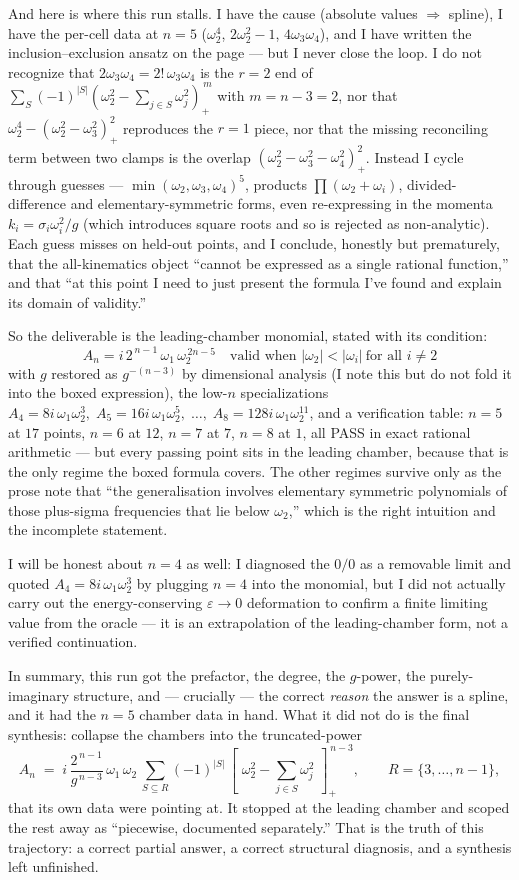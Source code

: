\documentclass{article}
\newcommand{\pp}[1]{\left[\,#1\,\right]_{+}}
\begin{document}
And here is where this run stalls. I have the cause (absolute values $\Rightarrow$
spline), I have the per-cell data at $n=5$ ($\omega_2^4$, $2\omega_2^2-1$,
$4\omega_3\omega_4$), and I have written the inclusion--exclusion ansatz on the
page --- but I never close the loop. I do not recognize that
$2\omega_3\omega_4=2!\,\omega_3\omega_4$ is the $r=2$ end of
$\sum_{S}(-1)^{|S|}(\omega_2^2-\sum_{j\in S}\omega_j^2)_+^{\,m}$ with $m=n-3=2$,
nor that $\omega_2^4-(\omega_2^2-\omega_3^2)_+^2$ reproduces the $r=1$ piece, nor
that the missing reconciling term between two clamps is the overlap
$(\omega_2^2-\omega_3^2-\omega_4^2)_+^2$. Instead I cycle through guesses ---
$\min(\omega_2,\omega_3,\omega_4)^5$, products $\prod(\omega_2+\omega_i)$,
divided-difference and elementary-symmetric forms, even re-expressing in the
momenta $k_i=\sigma_i\omega_i^2/g$ (which introduces square roots and so is
rejected as non-analytic). Each guess misses on held-out points, and I conclude,
honestly but prematurely, that the all-kinematics object ``cannot be expressed as
a single rational function,'' and that ``at this point I need to just present the
formula I've found and explain its domain of validity.''

So the deliverable is the leading-chamber monomial, stated with its condition:
\[
\boxed{\;A_n=i\,2^{\,n-1}\,\omega_1\,\omega_2^{\,2n-5}\quad
\text{valid when }|\omega_2|<|\omega_i|\ \text{for all }i\neq2\;}
\]
with $g$ restored as $g^{-(n-3)}$ by dimensional analysis (I note this but do not
fold it into the boxed expression), the low-$n$ specializations
$A_4=8i\,\omega_1\omega_2^3,\;A_5=16i\,\omega_1\omega_2^5,\;\dots,\;
A_8=128i\,\omega_1\omega_2^{11}$, and a verification table: $n=5$ at $17$ points,
$n=6$ at $12$, $n=7$ at $7$, $n=8$ at $1$, all PASS in exact rational arithmetic
--- but every passing point sits in the leading chamber, because that is the only
regime the boxed formula covers. The other regimes survive only as the prose
note that ``the generalisation involves elementary symmetric polynomials of those
plus-sigma frequencies that lie below $\omega_2$,'' which is the right intuition
and the incomplete statement.

I will be honest about $n=4$ as well: I diagnosed the $0/0$ as a removable
limit and quoted $A_4=8i\,\omega_1\omega_2^3$ by plugging $n=4$ into the monomial,
but I did not actually carry out the energy-conserving $\varepsilon\to0$
deformation to confirm a finite limiting value from the oracle --- it is an
extrapolation of the leading-chamber form, not a verified continuation.

In summary, this run got the prefactor, the degree, the $g$-power, the
purely-imaginary structure, and --- crucially --- the correct \emph{reason} the
answer is a spline, and it had the $n=5$ chamber data in hand. What it did not do
is the final synthesis: collapse the chambers into the truncated-power
\[
A_n \;=\; i\,\frac{2^{\,n-1}}{g^{\,n-3}}\,\omega_1\,\omega_2\,
\sum_{S\subseteq R}(-1)^{|S|}\,
\pp{\,\omega_2^2-\textstyle\sum_{j\in S}\omega_j^2\,}^{\,n-3},
\qquad R=\{3,\dots,n-1\},
\]
that its own data were pointing at. It stopped at the leading chamber and scoped
the rest away as ``piecewise, documented separately.'' That is the truth of this
trajectory: a correct partial answer, a correct structural diagnosis, and a
synthesis left unfinished.
\end{document}
